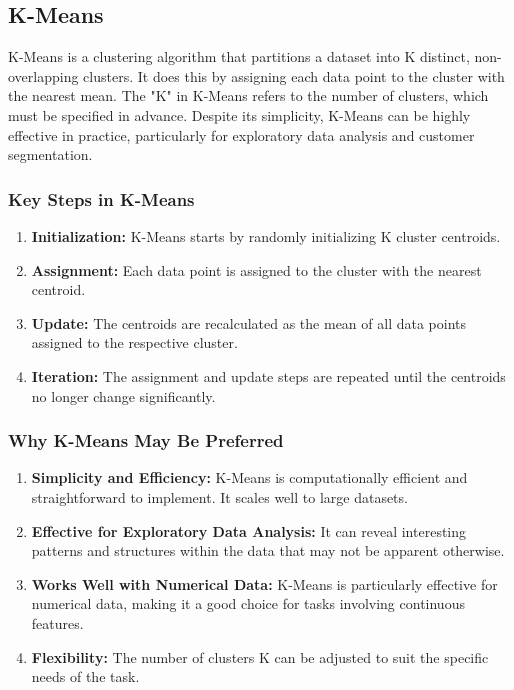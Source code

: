 \documentclass[openany]{report}
\begin{document}
\subsection{K-Means}
K-Means is a clustering algorithm that partitions a dataset into K distinct, non-overlapping clusters. It does this by assigning each data point to the cluster with the nearest mean. The "K" in K-Means refers to the number of clusters, which must be specified in advance. Despite its simplicity, K-Means can be highly effective in practice, particularly for exploratory data analysis and customer segmentation.

\subsubsection{Key Steps in K-Means}
\begin{enumerate}
    \item \textbf{Initialization:} K-Means starts by randomly initializing K cluster centroids.
    \item \textbf{Assignment:} Each data point is assigned to the cluster with the nearest centroid.
    \item \textbf{Update:} The centroids are recalculated as the mean of all data points assigned to the respective cluster.
    \item \textbf{Iteration:} The assignment and update steps are repeated until the centroids no longer change significantly.
\end{enumerate}

\subsubsection{Why K-Means May Be Preferred}
\begin{enumerate}
    \item \textbf{Simplicity and Efficiency:} K-Means is computationally efficient and straightforward to implement. It scales well to large datasets.
    \item \textbf{Effective for Exploratory Data Analysis:} It can reveal interesting patterns and structures within the data that may not be apparent otherwise.
    \item \textbf{Works Well with Numerical Data:} K-Means is particularly effective for numerical data, making it a good choice for tasks involving continuous features.
    \item \textbf{Flexibility:} The number of clusters K can be adjusted to suit the specific needs of the task.
\end{enumerate}
\end{document}
